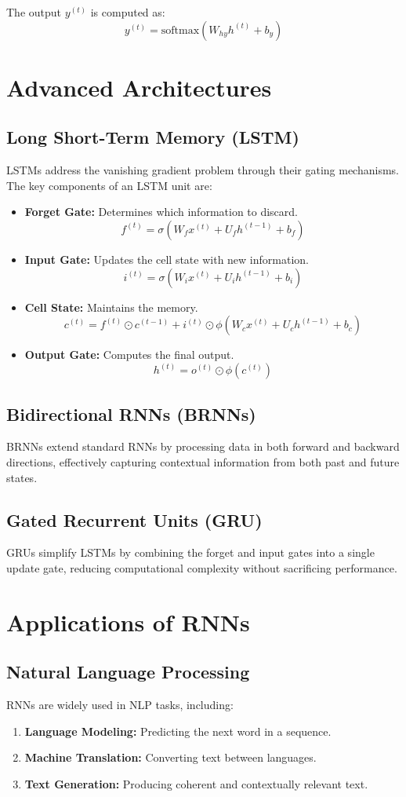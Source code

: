 \documentclass[12pt]{article}
\begin{document}
The output \( y^{(t)} \) is computed as:
\[
y^{(t)} = \text{softmax}(W_{hy} h^{(t)} + b_y)
\]

\section{Advanced Architectures}
\subsection{Long Short-Term Memory (LSTM)}
LSTMs address the vanishing gradient problem through their gating mechanisms. The key components of an LSTM unit are:
\begin{itemize}
    \item \textbf{Forget Gate:} Determines which information to discard.
    \[
    f^{(t)} = \sigma(W_f x^{(t)} + U_f h^{(t-1)} + b_f)
    \]
    \item \textbf{Input Gate:} Updates the cell state with new information.
    \[
    i^{(t)} = \sigma(W_i x^{(t)} + U_i h^{(t-1)} + b_i)
    \]
    \item \textbf{Cell State:} Maintains the memory.
    \[
    c^{(t)} = f^{(t)} \odot c^{(t-1)} + i^{(t)} \odot \phi(W_c x^{(t)} + U_c h^{(t-1)} + b_c)
    \]
    \item \textbf{Output Gate:} Computes the final output.
    \[
    h^{(t)} = o^{(t)} \odot \phi(c^{(t)})
    \]
\end{itemize}

\subsection{Bidirectional RNNs (BRNNs)}
BRNNs extend standard RNNs by processing data in both forward and backward directions, effectively capturing contextual information from both past and future states.

\subsection{Gated Recurrent Units (GRU)}
GRUs simplify LSTMs by combining the forget and input gates into a single update gate, reducing computational complexity without sacrificing performance.

\section{Applications of RNNs}
\subsection{Natural Language Processing}
RNNs are widely used in NLP tasks, including:
\begin{enumerate}
    \item \textbf{Language Modeling:} Predicting the next word in a sequence.
    \item \textbf{Machine Translation:} Converting text between languages.
    \item \textbf{Text Generation:} Producing coherent and contextually relevant text.
\end{enumerate}
\end{document}
